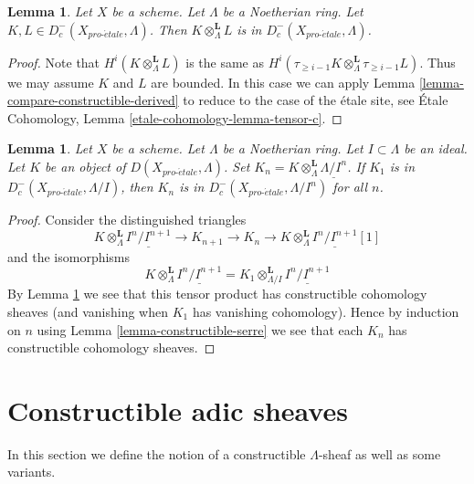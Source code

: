 \documentclass{stacks-project}
\theoremstyle{plain}
\newtheorem{lemma}[subsection]{Lemma}
\theoremstyle{definition}
\theoremstyle{remark}
\numberwithin{equation}{subsection}
\def\proetale{{pro\text{-}\acute{e}tale}}
\begin{document}
\begin{lemma}
\label{lemma-tensor-c}
Let $X$ be a scheme. Let $\Lambda$ be a Noetherian ring.
Let $K, L \in D_c^-(X_\proetale, \Lambda)$. Then
$K \otimes_\Lambda^\mathbf{L} L$ is in $D_c^-(X_\proetale, \Lambda)$.
\end{lemma}

\begin{proof}
Note that $H^i(K \otimes_\Lambda^\mathbf{L} L)$ is the same as
$H^i(\tau_{\geq i - 1}K \otimes_\Lambda^\mathbf{L} \tau_{\geq i - 1}L)$.
Thus we may assume $K$ and $L$ are bounded.
In this case we can apply Lemma \ref{lemma-compare-constructible-derived} to
reduce to the case of the \'etale site, see
\'Etale Cohomology, Lemma \ref{etale-cohomology-lemma-tensor-c}.
\end{proof}

\begin{lemma}
\label{lemma-compare-truncations-constructible}
Let $X$ be a scheme. Let $\Lambda$ be a Noetherian ring.
Let $I \subset \Lambda$ be an ideal.
Let $K$ be an object of $D(X_\proetale, \Lambda)$.
Set $K_n = K \otimes_\Lambda^\mathbf{L} \underline{\Lambda/I^n}$.
If $K_1$ is in $D^-_c(X_\proetale, \Lambda/I)$, then
$K_n$ is in $D^-_c(X_\proetale, \Lambda/I^n)$ for all $n$.
\end{lemma}

\begin{proof}
Consider the distinguished triangles
$$
K \otimes_\Lambda^\mathbf{L} \underline{I^n/I^{n + 1}} \to
K_{n + 1} \to
K_n \to
K \otimes_\Lambda^\mathbf{L} \underline{I^n/I^{n + 1}}[1]
$$
and the isomorphisms
$$
K \otimes_\Lambda^\mathbf{L} \underline{I^n/I^{n + 1}} =
K_1 \otimes_{\Lambda/I}^\mathbf{L} \underline{I^n/I^{n + 1}}
$$
By Lemma \ref{lemma-tensor-c} we see that this tensor product has
constructible cohomology sheaves (and vanishing when $K_1$ has
vanishing cohomology). Hence by induction on $n$ using
Lemma \ref{lemma-constructible-serre}
we see that each $K_n$ has constructible cohomology sheaves.
\end{proof}








\section{Constructible adic sheaves}
\label{section-adic}

\noindent
In this section we define the notion of a constructible
$\Lambda$-sheaf as well as some variants.
\end{document}
